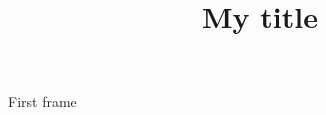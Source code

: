 \documentclass{beamer}
\title{My title}
\begin{document}
\maketitle

\begin{frame}{First frame}
\end{frame}
\end{document}
